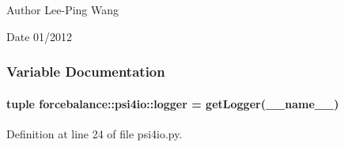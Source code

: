 \begin{DoxyAuthor}{\-Author}
\-Lee-\/\-Ping \-Wang 
\end{DoxyAuthor}
\begin{DoxyDate}{\-Date}
01/2012 
\end{DoxyDate}


\subsubsection{\-Variable \-Documentation}
\hypertarget{namespaceforcebalance_1_1psi4io_a85855b56ce0b3b067933fa20103854c3}{
\paragraph[{logger}]{\setlength{\rightskip}{0pt plus 5cm}tuple {\bf forcebalance\-::psi4io\-::logger} = get\-Logger(\-\_\-\-\_\-name\-\_\-\-\_\-)}}\label{namespaceforcebalance_1_1psi4io_a85855b56ce0b3b067933fa20103854c3}


\-Definition at line 24 of file psi4io.\-py.

